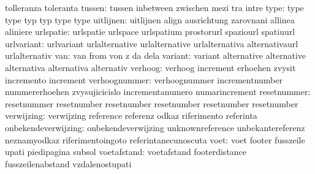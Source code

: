                            tolleranza                toleranta
                   tussen: tussen                    inbetween
                           zwischen                  mezi
                           tra                       intre
                     type: type                      type
                           typ                       typ
                           type                      type %
                uitlijnen: uitlijnen                 align
                           ausrichtung               zarovnani
                           allinea                   aliniere
                urlspatie: urlspatie                 urlspace
                           urlspatium                prostorurl
                           spaziourl                 spatiuurl
               urlvariant: urlvariant                urlalternative
                           urlalternative            urlalternativa
                           alternativaurl            urlalternativ
                      van: van                       from
                           von                       z
                           da                        dela
                  variant: variant                   alternative
                           alternative               alternativa
                           alternativa               alternativ
                  verhoog: verhoog                   increment
                           erhoehen                  zvysit
                           incremento                increment %
            verhoognummer: verhoognummer             incrementnumber
                           nummererhoehen            zvysujicicislo
                           incrementanumero          numarincrement
resetnummer: resetnummer             resetnumber
             resetnumber             resetnumber
             resetnumber             resetnumber
               verwijzing: verwijzing                reference
                           referenz                  odkaz
                           riferimento               referinta
      onbekendeverwijzing: onbekendeverwijzing       unknownreference
                           unbekantereferenz         neznamyodkaz
                           riferimentoingoto         referintanecunoscuta
                     voet: voet                      footer
                           fusszeile                 upati
                           piedipagina               subsol
              voetafstand: voetafstand               footerdistance
                           fusszeilenabstand         vzdalenostupati
